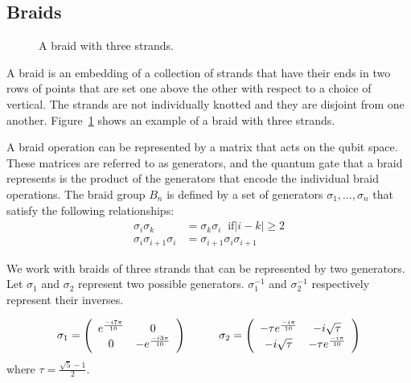 \subsection{Braids}



\begin{figure}[htbp]
\begin{center}
\caption{A braid with three strands.}
\label{fig:BRAID}
\end{center}
\end{figure}

A braid \cite{Kaufman_et_al:2006} is an embedding of a collection of strands that have their ends in two rows of points that are set one above the other with respect to a choice of vertical. The strands are not individually knotted and they are disjoint from one another. Figure~\ref{fig:BRAID} shows an example of a braid with three strands. 


A braid operation can be represented by a matrix that acts on the qubit space. These matrices are referred to as generators, and the quantum gate that a braid represents is the product of the generators that encode the individual braid operations. The braid group $B_n$ is defined by a set of generators $\sigma_1,\dots,\sigma_n$ that satisfy the following relationships:
 \begin{align}
  \sigma_i \sigma_k &= \sigma_k \sigma_i \; \; \text{if} |i-k| \geq 2 \\
    \sigma_i \sigma_{i+1} \sigma_i &=  \sigma_{i+1} \sigma_i \sigma_{i+1} 
 \end{align}

We work with braids of three strands that can be represented by two generators. Let $\sigma_1$ and $\sigma_2$ represent two possible generators.  $\sigma_1^{-1}$   and $\sigma_2^{-1}$ respectively represent their inverses. 


\begin{equation}
\sigma_1 =  \left( \begin{array}{cc}
e^{\frac{-i7\pi}{10}}   & 0 \\
0 & -e^{\frac{-i3\pi}{10}}   \end{array} \right) 
\hspace{1.0cm} 
\sigma_2 =  \left( \begin{array}{cc}
-\tau e^{\frac{-i \pi}{10}}   & -i \sqrt{\tau} \\
-i \sqrt{\tau} & -\tau e^{\frac{-i\pi}{10}}   
\end{array} \right) \label{eq:SIG2}
\end{equation}
where $\tau = \frac{\sqrt{5} -1}{2}$. 

